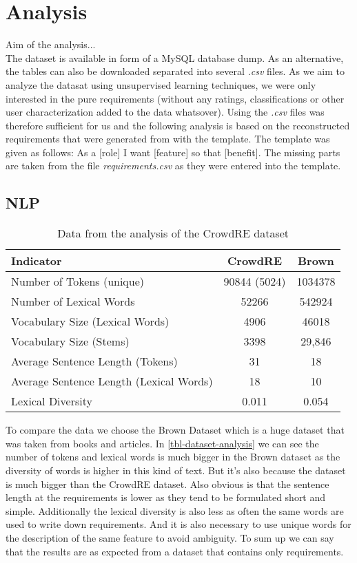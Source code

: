 \section{Analysis}
Aim of the analysis... \\

The \crowdre{} dataset is available in form of a MySQL database dump. As an alternative, the tables can also be downloaded separated into several \textit{.csv} files. As we aim to analyze the datasat using unsupervised learning techniques, we were only interested in the pure requirements (without any ratings, classifications or other user characterization added to the data whatsover). Using the \textit{.csv} files was therefore sufficient for us and the following analysis is based on the reconstructed requirements that were generated from with the template. The template was given as follows: As a [role] I want [feature] so that [benefit]. The missing parts are taken from the file \textit{requirements.csv} as they were entered into the template.

\subsection{NLP}
\begin{table}[bht]
\centering
\begin{tabular}{ | l | c | c | }
\hline
Indicator & CrowdRE & Brown \\ \hline
Number of Tokens (unique) & 90844 (5024) & 1034378 \\ \hline
Number of Lexical Words & 52266 & 542924 \\ \hline
Vocabulary Size (Lexical Words) & 4906 & 46018 \\ \hline
Vocabulary Size (Stems) & 3398 & 29,846 \\ \hline
Average Sentence Length (Tokens) & 31 & 18 \\ \hline
Average Sentence Length (Lexical Words) & 18 & 10 \\ \hline
Lexical Diversity & 0.011 & 0.054 \\ \hline
\end{tabular}
\caption{Data from the analysis of the CrowdRE dataset}\label{tbl-dataset-analysis}
\end{table}

To compare the data we choose the Brown Dataset which is a huge dataset that was taken from books and articles. In \autoref{tbl-dataset-analysis} we can see the number of tokens and lexical words is much bigger in the Brown dataset as the diversity of words is higher in this kind of text. But it's also because the dataset is much bigger than the CrowdRE dataset. Also obvious is that the sentence length at the requirements is lower as they tend to be formulated short and simple. Additionally the lexical diversity is also less as often the same words are used to write down requirements. And it is also necessary to use unique words for the description of the same feature to avoid ambiguity. To sum up we can say that the results are as expected from a dataset that contains only requirements.

